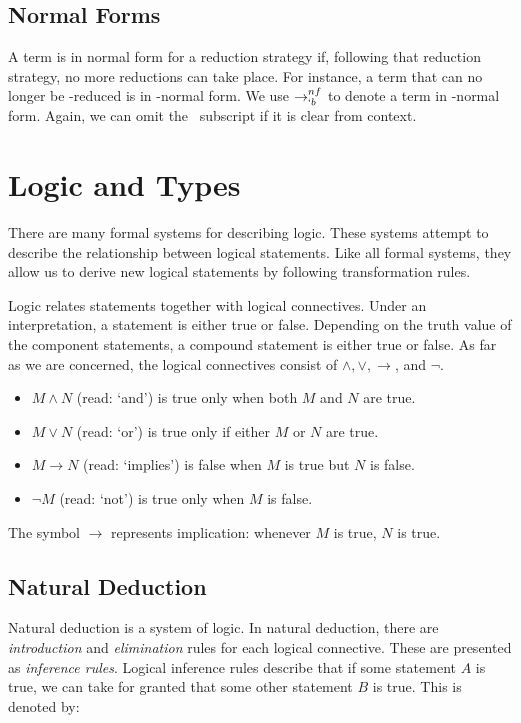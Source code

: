   
  \subsection{Normal Forms}
 
  A term is in normal form for a reduction strategy if, 
    following that reduction strategy,
  no more reductions can take place.
  For instance, a term that can no longer be \bta-reduced is in \bta-normal form.
  We use $\to_{`b}^{nf}$ to denote a term in \bta-normal form.
  Again, we can omit the \bta\ subscript if it is clear from context.

\section{Logic and Types}

  There are many formal systems for describing logic.
  These systems attempt to describe the relationship between logical statements.
  Like all formal systems, 
  they allow us to derive new logical statements by following transformation rules.

  Logic relates statements together with logical connectives.
  Under an interpretation, a statement is either true or false.
  Depending on the truth value of the component statements, a compound statement is either true or false.
  As far as we are concerned, the logical connectives consist of $\land, \lor, \to$, and $\neg$.
  \begin{itemize}
    \item $M \land N$ (read: `and') is true only when both $M$ and $N$ are true.
    \item $M \lor N$ (read: `or') is true only if either $M$ or $N$ are true. 
    \item $M \to N$ (read: `implies') is false when $M$ is true but $N$ is false.
    \item $\neg M$ (read: `not') is true only when $M$ is false.
  \end{itemize}
  The symbol $\to$ represents implication: whenever $M$ is true, $N$ is true.
  
  \subsection{Natural Deduction}
 
  Natural deduction is a system of logic.
  In natural deduction, there are \emph{introduction} and \emph{elimination} rules for each logical connective.
  These are presented as \emph{inference rules}.
  Logical inference rules describe that if some statement $A$ is true,
  we can take for granted that some other statement $B$ is true.
  This is denoted by:
  
